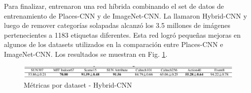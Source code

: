 Para finalizar, entrenaron una red híbrida combinando el set de datos de entrenamiento de Places-CNN y de ImageNet-CNN. La llamaron Hybrid-CNN y luego de remover categorías solapadas alcanzó los 3.5 millones de imágenes pertenecientes a 1183 etiquetas diferentes. Esta red logró pequeñas mejoras en algunos de los datasets utilizados en la comparación entre Places-CNN e ImageNet-CNN. Los resultados se muestran en Fig. \ref{fig:placesmetricshybrid}.
\begin{figure}[h!]
	\centering
	\includegraphics[width=1\linewidth]{images/places_metrics_hybrid}
	\caption[Métricas por dataset - Hybrid-CNN]{Métricas por dataset - Hybrid-CNN}
	\label{fig:placesmetricshybrid}
\end{figure}


